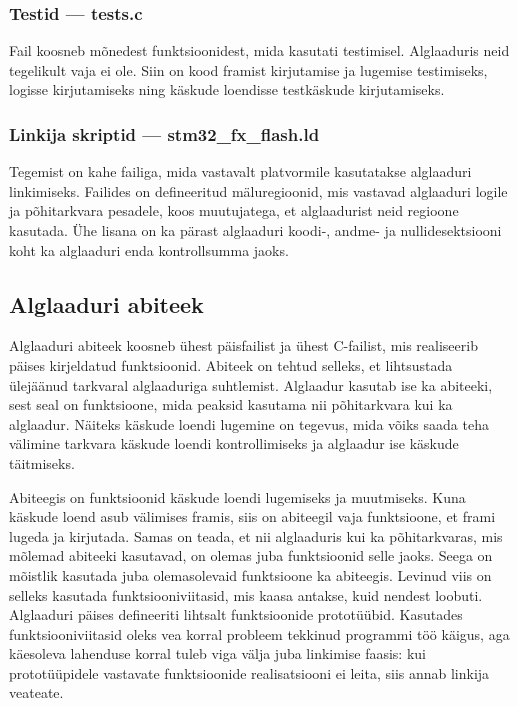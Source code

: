 \documentclass[12pt,a4paper]{article}
\begin{document}
\subsubsection{Testid --- \textbf{tests.c}}
Fail koosneb mõnedest funktsioonidest, mida kasutati testimisel. Alglaaduris
neid tegelikult vaja ei ole. Siin on kood \gls{fram}ist kirjutamise ja lugemise
testimiseks, logisse kirjutamiseks ning käskude loendisse testkäskude
kirjutamiseks.

\subsubsection{Linkija skriptid --- \textbf{stm32\_fx\_flash.ld}}
Tegemist on kahe failiga, mida vastavalt platvormile kasutatakse alglaaduri
linkimiseks. Failides on defineeritud mäluregioonid, mis vastavad alglaaduri
logile ja põhitarkvara pesadele, koos muutujatega, et alglaadurist neid regioone
kasutada. Ühe lisana on ka pärast alglaaduri koodi-, andme- ja
nullidesektsiooni koht ka alglaaduri enda kontrollsumma jaoks.

\subsection{Alglaaduri abiteek}
Alglaaduri abiteek koosneb ühest päisfailist ja ühest C-failist, mis realiseerib
päises kirjeldatud funktsioonid. Abiteek on tehtud selleks, et lihtsustada
ülejäänud tarkvaral alglaaduriga suhtlemist. Alglaadur kasutab ise ka abiteeki,
sest seal on funktsioone, mida peaksid kasutama nii põhitarkvara kui ka
alglaadur. Näiteks käskude loendi lugemine on tegevus, mida võiks saada teha
välimine tarkvara käskude loendi kontrollimiseks ja alglaadur ise käskude
täitmiseks.

Abiteegis on funktsioonid käskude loendi lugemiseks ja muutmiseks. Kuna käskude
loend asub välimises \gls{fram}is, siis on abiteegil vaja funktsioone, et
\gls{fram}i lugeda ja kirjutada. Samas on teada, et nii alglaaduris kui ka
põhitarkvaras, mis mõlemad abiteeki kasutavad, on olemas juba funktsioonid selle
jaoks. Seega on mõistlik kasutada juba olemasolevaid funktsioone ka abiteegis.
Levinud viis on selleks kasutada funktsiooniviitasid, mis kaasa antakse, kuid
nendest loobuti. Alglaaduri päises defineeriti lihtsalt funktsioonide prototüübid.
Kasutades funktsiooniviitasid oleks vea korral probleem tekkinud programmi töö
käigus, aga käesoleva lahenduse korral tuleb viga välja juba linkimise faasis:
kui prototüüpidele vastavate funktsioonide realisatsiooni ei leita, siis annab
linkija veateate.
\end{document}
